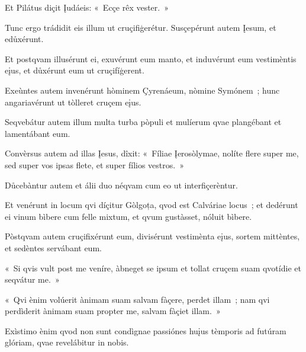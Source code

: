 Et Pilátus diçit Įudáeis: «~Ecçe rêx vester.~» 

Tunc ergo trádidit eis illum ut cruçifiģerétur. Susçepérunt autem Įesum, et edůxérunt. 


Et postqvam illusérunt ei, exuvérunt eum manto, et induvérunt eum vestimèntis eįus, et důxérunt eum ut cruçifíģerent. 

Exeùntes autem invenérunt hòminem Çyrenáeum, nòmine Symónem~; hunc angariavérunt ut tòlleret cruçem eįus. 

Seqvebátur autem illum multa turba pòpuli et mulíerum qvae plangébant et lamentábant eum. 

Convèrsus autem ad illas Įesus, dîxit: «~Fíliae Įerosòlymae, nolíte flere super me, sed super vos ipsas flete, et super fílios vestros.~» 

Důcebàntur autem et álii duo néqvam cum eo ut interfiçerèntur. 

Et venérunt in locum qvi díçitur Gòlgoța, qvod est Calváriae locus~; et dedérunt ei vinum bìbere cum felle mixtum, et qvum gustàsset, nóluit bìbere. 

Pòstqvam autem cruçifixérunt eum, divisérunt vestimènta eįus, sortem mittèntes, et sedèntes servábant eum. 

«~Si qvis vult post me veníre, àbneget se ipsum et tollat cruçem suam qvotídie et seqvátur me.~» 

«~Qvi ènim volúerit ànimam suam salvam fàçere, perdet illam~; nam qvi perdìderit ànimam suam propter me, salvam fàçiet illam.~» 

Exìstimo ènim qvod non sunt condìgnae passiónes huįus tèmporis ad futúram glóriam, qvae revelábitur in nobis. 


